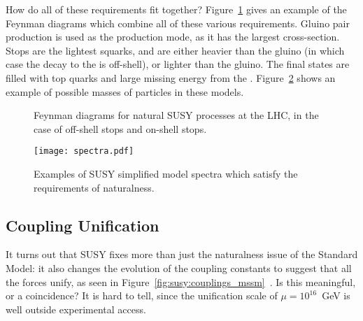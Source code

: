 
How do all of these requirements fit together? Figure~\ref{fig:susy:gtt} gives an example of the Feynman diagrams which combine all of these various requirements. Gluino pair production is used as the production mode, as it has the largest cross-section. Stops are the lightest squarks, and are either heavier than the gluino (in which case the decay to the \lsp is off-shell), or lighter than the gluino. The final states are filled with top quarks and large missing energy from the \lsp. Figure~\ref{fig:susy:spectra} shows an example of possible masses of particles in these models.



\begin{figure}
\centering
{}
\label{fig:susy:gtt}
\caption{Feynman diagrams for natural SUSY processes at the LHC, in the case of off-shell stops and on-shell stops.}
\end{figure}




\begin{figure}
\centering
\texttt{[image: spectra.pdf]}
\label{fig:susy:spectra}
\caption{Examples of SUSY simplified model spectra which satisfy the requirements of naturalness.}
\end{figure}





\subsection{Coupling Unification}


It turns out that SUSY fixes more than just the naturalness issue of the Standard Model: it also changes the evolution of the coupling constants to suggest that all the forces unify, as seen in Figure~\ref{fig:susy:couplings_mssm}~\cite{susypheno}. Is this meaningful, or a coincidence? It is hard to tell, since the unification scale of $\mu = 10^{16}$~GeV is well outside experimental access.


